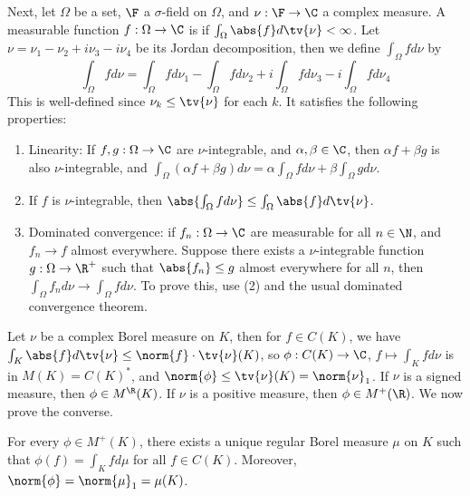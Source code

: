 \documentclass[a4paper]{article}
\begin{document}
Next, let $\Omega$ be a set, $\F$ a $\sigma$-field on $\Omega$, and $\nu:\F\to\C$ a complex measure. A measurable function $f:\Omega\to\C$ is  if $\int_\Omega\abs{f}d\tv{\nu}<\infty$. Let $\nu=\nu_1-\nu_2+i\nu_3-i\nu_4$ be its Jordan decomposition, then we define $\int_\Omega fd\nu$ by
\[\int_\Omega fd\nu=\int_\Omega fd\nu_1-\int_\Omega fd\nu_2+i\int_\Omega fd\nu_3-i\int_\Omega fd\nu_4\]
This is well-defined since $\nu_k\leq\tv{\nu}$ for each $k$. It satisfies the following properties:
\begin{enumerate}[label=(\arabic*)]
	\item Linearity: If $f,g:\Omega\to\C$ are $\nu$-integrable, and $\alpha,\beta\in\C$, then $\alpha f+\beta g$ is also $\nu$-integrable, and $\int_\Omega(\alpha f+\beta g)d\nu=\alpha\int_\Omega fd\nu+\beta\int_\Omega gd\nu$.
	\item If $f$ is $\nu$-integrable, then $\abs{\int_\Omega fd\nu}\leq\int_\Omega\abs{f}d\tv{\nu}$.
	\item Dominated convergence: if $f_n:\Omega\to\C$ are measurable for all $n\in\N$, and $f_n\to f$ almost everywhere. Suppose there exists a $\nu$-integrable function $g:\Omega\to\R^+$ such that $\abs{f_n}\leq g$ almost everywhere for all $n$, then $\int_\Omega f_nd\nu\to\int_\Omega fd\nu$. To prove this, use (2) and the usual dominated convergence theorem.
\end{enumerate}

\begin{remark}
  Let $\nu$ be a complex Borel measure on $K$, then for $f\in C(K)$, we have $\int_K\abs{f}d\tv{\nu}\leq\norm{f}\cdot\tv{\nu}(K)$, so $\phi:C(K)\to\C$, $f\mapsto\int_K fd\nu$ is in $M(K)=C(K)^*$, and $\norm{\phi}\leq\tv{\nu}(K)=\norm{\nu}_1$. If $\nu$ is a signed measure, then $\phi\in M^\R(K)$. If $\nu$ is a positive measure, then $\phi\in M^+(\R)$. We now prove the converse.
\end{remark}

\begin{nthm} \label{thm:RieszRepresentation}
  For every $\phi\in M^+(K)$, there exists a unique regular Borel measure $\mu$ on $K$ such that $\phi(f)=\int_K fd\mu$ for all $f\in C(K)$. Moreover, $\norm{\phi}=\norm{\mu}_1=\mu(K)$.
\end{nthm}
\end{document}
